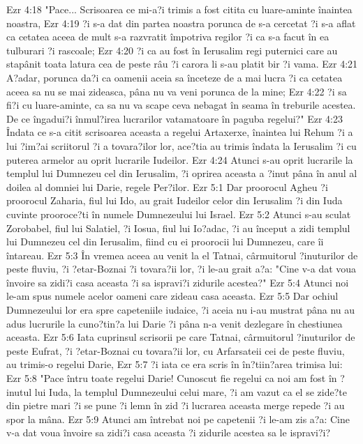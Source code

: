 Ezr 4:18  "Pace... Scrisoarea ce mi-a?i trimis a fost citita cu luare-aminte înaintea noastra,
Ezr 4:19  ?i s-a dat din partea noastra porunca de s-a cercetat ?i s-a aflat ca cetatea aceea de mult s-a razvratit împotriva regilor ?i ca s-a facut în ea tulburari ?i rascoale;
Ezr 4:20  ?i ca au fost în Ierusalim regi puternici care au stapânit toata latura cea de peste râu ?i carora li s-au platit bir ?i vama.
Ezr 4:21  A?adar, porunca da?i ca oamenii aceia sa înceteze de a mai lucra ?i ca cetatea aceea sa nu se mai zideasca, pâna nu va veni porunca de la mine;
Ezr 4:22  ?i sa fi?i cu luare-aminte, ca sa nu va scape ceva nebagat în seama în treburile acestea. De ce îngadui?i înmul?irea lucrarilor vatamatoare în paguba regelui?"
Ezr 4:23  Îndata ce s-a citit scrisoarea aceasta a regelui Artaxerxe, înaintea lui Rehum ?i a lui ?im?ai scriitorul ?i a tovara?ilor lor, ace?tia au trimis îndata la Ierusalim ?i cu puterea armelor au oprit lucrarile Iudeilor.
Ezr 4:24  Atunci s-au oprit lucrarile la templul lui Dumnezeu cel din Ierusalim, ?i oprirea aceasta a ?inut pâna în anul al doilea al domniei lui Darie, regele Per?ilor.
Ezr 5:1  Dar proorocul Agheu ?i proorocul Zaharia, fiul lui Ido, au grait Iudeilor celor din Ierusalim ?i din Iuda cuvinte prooroce?ti în numele Dumnezeului lui Israel.
Ezr 5:2  Atunci s-au sculat Zorobabel, fiul lui Salatiel, ?i Iosua, fiul lui Io?adac, ?i au început a zidi templul lui Dumnezeu cel din Ierusalim, fiind cu ei proorocii lui Dumnezeu, care îi întareau.
Ezr 5:3  În vremea aceea au venit la el Tatnai, cârmuitorul ?inuturilor de peste fluviu, ?i ?etar-Boznai ?i tovara?ii lor, ?i le-au grait a?a: "Cine v-a dat voua învoire sa zidi?i casa aceasta ?i sa ispravi?i zidurile acestea?"
Ezr 5:4  Atunci noi le-am spus numele acelor oameni care zideau casa aceasta.
Ezr 5:5  Dar ochiul Dumnezeului lor era spre capeteniile iudaice, ?i aceia nu i-au mustrat pâna nu au adus lucrurile la cuno?tin?a lui Darie ?i pâna n-a venit dezlegare în chestiunea aceasta.
Ezr 5:6  Iata cuprinsul scrisorii pe care Tatnai, cârmuitorul ?inuturilor de peste Eufrat, ?i ?etar-Boznai cu tovara?ii lor, cu Arfarsateii cei de peste fluviu, au trimis-o regelui Darie,
Ezr 5:7  ?i iata ce era scris în în?tiin?area trimisa lui:
Ezr 5:8  "Pace întru toate regelui Darie! Cunoscut fie regelui ca noi am fost în ?inutul lui Iuda, la templul Dumnezeului celui mare, ?i am vazut ca el se zide?te din pietre mari ?i se pune ?i lemn în zid ?i lucrarea aceasta merge repede ?i au spor la mâna.
Ezr 5:9  Atunci am întrebat noi pe capetenii ?i le-am zis a?a: Cine v-a dat voua învoire sa zidi?i casa aceasta ?i zidurile acestea sa le ispravi?i?
